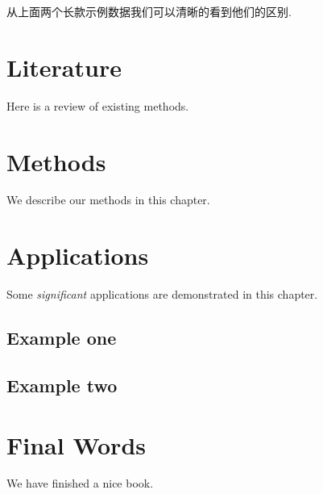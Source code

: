 \documentclass[]{book}
\begin{document}
从上面两个长款示例数据我们可以清晰的看到他们的区别.

\hypertarget{literature}{%
\chapter{Literature}\label{literature}}

Here is a review of existing methods.

\hypertarget{methods}{%
\chapter{Methods}\label{methods}}

We describe our methods in this chapter.

\hypertarget{applications}{%
\chapter{Applications}\label{applications}}

Some \emph{significant} applications are demonstrated in this chapter.

\hypertarget{example-one}{%
\section{Example one}\label{example-one}}

\hypertarget{example-two}{%
\section{Example two}\label{example-two}}

\hypertarget{final-words}{%
\chapter{Final Words}\label{final-words}}

We have finished a nice book.


\end{document}
